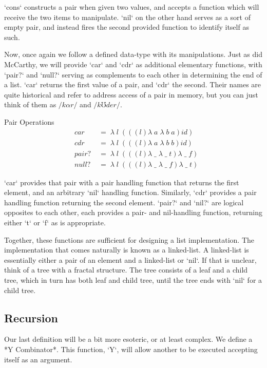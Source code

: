 `cons` constructs a pair when given two values, and accepts a function which will 
receive the two items to manipulate. `nil` on the other hand serves as a sort of 
empty pair, and instead fires the second provided function to identify itself as 
such.

Now, once again we follow a defined data-type with its manipulations. Just as did 
McCarthy, we will provide `car` and `cdr` as additional elementary functions, with 
`pair?` and `null?` serving as complements to each other in determining the end of 
a list. `car` returns the first value of a pair, and `cdr` the second. Their names 
are quite historical and refer to address access of a pair in memory, but you can 
just think of them as $/k \alpha r/$ and $/k \mho d e r/$.

Pair Operations
\begin{align*}
& car \; &= \; \lambda \; l \; (((l)\lambda \; a \; \lambda \; b \; a)id)
\\& cdr \; &= \; \lambda \; l \; (((l)\lambda \; a \; \lambda \; b \; b)id)
\\& pair? \; &= \; \lambda \; l \; (((l)\lambda \; \_ \; \lambda \; \_ \; t)\lambda \; \_ \; f)
\\& null? \; &= \; \lambda \; l \; (((l)\lambda \; \_ \; \lambda \; \_ \; f)\lambda \; \_ \; t)
\end{align*}

`car` provides that pair with a pair handling function that returns the first 
element, and an arbitrary `nil` handling function. Similarly, `cdr` provides a 
pair handling function returning the second element. `pair?` and `nil?` are 
logical opposites to each other, each provides a pair- and nil-handling function, 
returning either `t` or `f` as is appropriate.

Together, these functions are sufficient for designing a list implementation. The 
implementation that comes naturally is known as a linked-list. A linked-list is 
essentially either a pair of an element and a linked-list or `nil`. If that is 
unclear, think of a tree with a fractal structure. The tree consists of a leaf and 
a child tree, which in turn has both leaf and child tree, until the tree ends with 
`nil` for a child tree.

\subsection{Recursion}
Our last definition will be a bit more esoteric, or at least complex. We define a 
*Y Combinator*. This function, `Y`, will allow another to be executed accepting 
itself as an argument.

